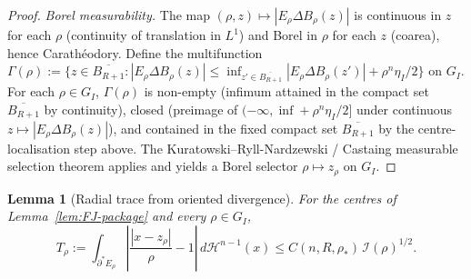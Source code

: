 \documentclass[11pt]{article}
\newtheorem{lemma}[theorem]{Lemma}
\theoremstyle{definition}
\newcommand{\rstar}{\rho_{*}}
\begin{document}
\begin{proof}
\emph{Borel measurability.}  The map
$(\rho,z)\mapsto|E_\rho\Delta B_\rho(z)|$ is continuous in $z$ for each
$\rho$ (continuity of translation in $L^1$) and Borel in $\rho$ for
each $z$ (coarea), hence Carath\'eodory.  Define the multifunction
$\Gamma(\rho):=\{z\in\overline{B_{R+1}}:|E_\rho\Delta B_\rho(z)|\le
\inf_{z'\in\overline{B_{R+1}}}|E_\rho\Delta B_\rho(z')|+\rho^n\eta_I/2\}$
on $G_I$.  For each $\rho\in G_I$, $\Gamma(\rho)$ is non-empty
(infimum attained in the compact set $\overline{B_{R+1}}$ by
continuity), closed (preimage of $(-\infty,\inf+\rho^n\eta_I/2]$ under
continuous $z\mapsto|E_\rho\Delta B_\rho(z)|$), and contained in the
fixed compact set $\overline{B_{R+1}}$ by the centre-localisation
step above.  The Kuratowski--Ryll-Nardzewski / Castaing measurable
selection theorem \cite[Thm.~III.6]{CastaingValadier1977} applies and
yields a Borel selector $\rho\mapsto z_\rho$ on $G_I$.
\end{proof}

\begin{lemma}[Radial trace from oriented divergence]\label{lem:radial-slicing}
For the centres of Lemma~\ref{lem:FJ-package} and every $\rho\in G_I$,
\begin{equation}\label{eq:radial-slicing}
   T_\rho:=\int_{\partial^*E_\rho}
      \left|\frac{|x-z_\rho|}{\rho}-1\right|\,d\mathcal H^{n-1}(x)
   \le C(n,R,\rstar)\,\mathcal I(\rho)^{1/2}.
\end{equation}
\end{lemma}
\end{document}

